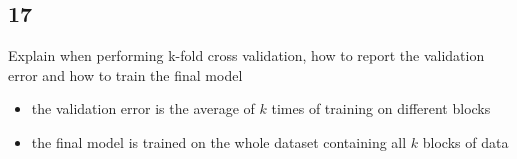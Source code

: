 \documentclass{article}
\begin{document}
\subsection*{17}
\begin{myleftlinebox}
    Explain when performing k-fold cross validation, how to report the validation error and how to train the final model
    \tcblower
    \begin{itemize}
        \item the validation error is the average of \(k\) times of training on different blocks
        \item the final model is trained on the whole dataset containing all \(k\) blocks of data
    \end{itemize}
\end{myleftlinebox}
\end{document}
